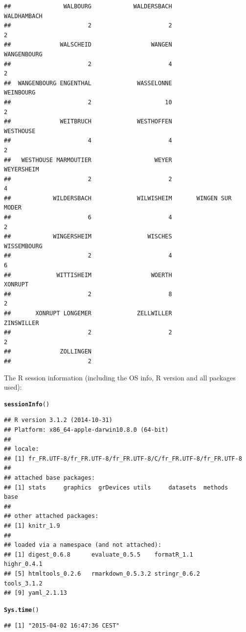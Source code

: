 \documentclass{article}\usepackage[]{graphicx}\usepackage[]{color}
\makeatletter
\newcommand{\hlstd}[1]{\textcolor[rgb]{0.345,0.345,0.345}{#1}}%
\newcommand{\hlkwd}[1]{\textcolor[rgb]{0.737,0.353,0.396}{\textbf{#1}}}%
\newenvironment{kframe}{%
 \def\at@end@of@kframe{}%
 \ifinner\ifhmode%
  \def\at@end@of@kframe{\end{minipage}}%
  \begin{minipage}{\columnwidth}%
 \fi\fi%
 \def\FrameCommand##1{\hskip\@totalleftmargin \hskip-\fboxsep
 \colorbox{shadecolor}{##1}\hskip-\fboxsep
     \hskip-\linewidth \hskip-\@totalleftmargin \hskip\columnwidth}%
 \MakeFramed {\advance\hsize-\width
   \@totalleftmargin\z@ \linewidth\hsize
   \@setminipage}}%
 {\par\unskip\endMakeFramed%
 \at@end@of@kframe}
\newenvironment{knitrout}{}{} %
\makeatother
\begin{document}
\begin{knitrout}
\begin{kframe}
\begin{verbatim}
##               WALBOURG            WALDERSBACH            WALDHAMBACH 
##                      2                      2                      2 
##              WALSCHEID                 WANGEN            WANGENBOURG 
##                      2                      4                      2 
##  WANGENBOURG ENGENTHAL             WASSELONNE              WEINBOURG 
##                      2                     10                      2 
##              WEITBRUCH             WESTHOFFEN              WESTHOUSE 
##                      4                      4                      2 
##   WESTHOUSE MARMOUTIER                  WEYER             WEYERSHEIM 
##                      2                      2                      4 
##            WILDERSBACH             WILWISHEIM       WINGEN SUR MODER 
##                      6                      4                      2 
##            WINGERSHEIM                WISCHES            WISSEMBOURG 
##                      2                      4                      6 
##             WITTISHEIM                 WOERTH                XONRUPT 
##                      2                      8                      2 
##       XONRUPT LONGEMER             ZELLWILLER             ZINSWILLER 
##                      2                      2                      2 
##              ZOLLINGEN 
##                      2
\end{verbatim}
\end{kframe}
\end{knitrout}

The R session information (including the OS info, R version and all
packages used):

\begin{knitrout}
\color{fgcolor}\begin{kframe}
\begin{alltt}
\hlkwd{sessionInfo}\hlstd{()}
\end{alltt}
\begin{verbatim}
## R version 3.1.2 (2014-10-31)
## Platform: x86_64-apple-darwin10.8.0 (64-bit)
## 
## locale:
## [1] fr_FR.UTF-8/fr_FR.UTF-8/fr_FR.UTF-8/C/fr_FR.UTF-8/fr_FR.UTF-8
## 
## attached base packages:
## [1] stats     graphics  grDevices utils     datasets  methods   base     
## 
## other attached packages:
## [1] knitr_1.9
## 
## loaded via a namespace (and not attached):
## [1] digest_0.6.8      evaluate_0.5.5    formatR_1.1       highr_0.4.1      
## [5] htmltools_0.2.6   rmarkdown_0.5.3.2 stringr_0.6.2     tools_3.1.2      
## [9] yaml_2.1.13
\end{verbatim}
\begin{alltt}
\hlkwd{Sys.time}\hlstd{()}
\end{alltt}
\begin{verbatim}
## [1] "2015-04-02 16:47:36 CEST"
\end{verbatim}
\end{kframe}
\end{knitrout}
\end{document}
